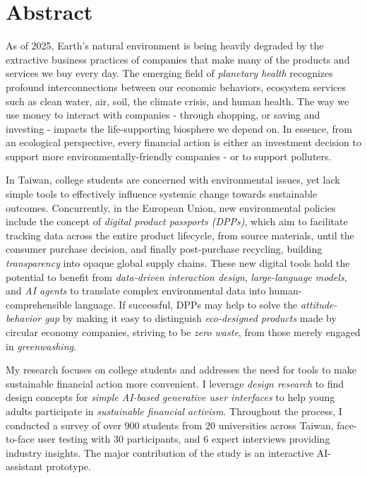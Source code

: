 \documentclass[
  12pt,
  letterpaper,
  DIV=11,
  numbers=noendperiod]{scrartcl}
\author{}
\date{}
\renewcommand{\listoftables}{}\KOMAoption{captions}{tableheading}
\begin{document}
\listoftables


\clearpage

\newpage

\section{Abstract}\label{abstract}

As of 2025, Earth's natural environment is being heavily degraded by the
extractive business practices of companies that make many of the
products and services we buy every day. The emerging field of
\emph{planetary health} recognizes profound interconnections between our
economic behaviors, ecosystem services such as clean water, air, soil,
the climate crisis, and human health. The way we use money to interact
with companies - through shopping, or saving and investing - impacts the
life-supporting biosphere we depend on. In essence, from an ecological
perspective, every financial action is either an investment decision to
support more environmentally-friendly companies - or to support
polluters.

In Taiwan, college students are concerned with environmental issues, yet
lack simple tools to effectively influence systemic change towards
sustainable outcomes. Concurrently, in the European Union, new
environmental policies include the concept of \emph{digital product
passports (DPPs)}, which aim to facilitate tracking data across the
entire product lifecycle, from source materials, until the consumer
purchase decision, and finally post-purchase recycling, building
\emph{transparency} into opaque global supply chains. These new digital
tools hold the potential to benefit from \emph{data-driven interaction
design}, \emph{large-language models}, and \emph{AI agents} to translate
complex environmental data into human-comprehensible language. If
successful, DPPs may help to solve the \emph{attitude-behavior gap} by
making it easy to distinguish \emph{eco-designed products} made by
circular economy companies, striving to be \emph{zero waste}, from those
merely engaged in \emph{greenwashing}.

My research focuses on college students and addresses the need for tools
to make sustainable financial action more convenient. I leverage
\emph{design research} to find design concepts for \emph{simple AI-based
generative user interfaces} to help young adults participate in
\emph{sustainable financial activism}. Throughout the process, I
conducted a survey of over 900 students from 20 universities across
Taiwan, face-to-face user testing with 30 participants, and 6 expert
interviews providing industry insights. The major contribution of the
study is an interactive AI-assistant prototype.
\end{document}
